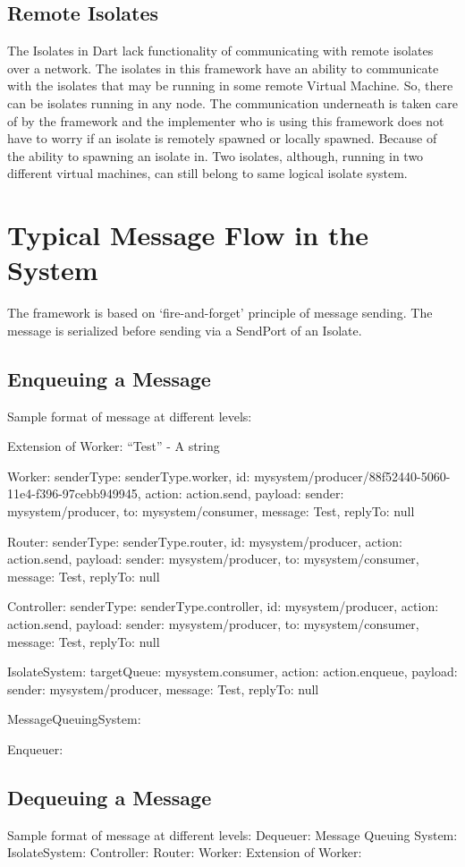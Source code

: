 \subsection{Remote Isolates}
The Isolates in Dart lack functionality of communicating with remote isolates over a network. The isolates in this framework have an ability to communicate with the isolates that may be running in some remote Virtual Machine. So, there can be isolates running in any node. The communication underneath is taken care of by the framework and the implementer who is using this framework does not have to worry if an isolate is remotely spawned or locally spawned.
Because of the ability to spawning an isolate in. Two isolates, although, running in two different virtual machines, can still belong to same logical isolate system.

\section{Typical Message Flow in the System}
The framework is based on ‘fire-and-forget’ principle of message sending.
The message is serialized before sending via a SendPort of an Isolate.

\subsection{Enqueuing a Message}
Sample format of message at different levels:

Extension of Worker: “Test” - A string

Worker:
{senderType: senderType.worker, id: mysystem/producer/88f52440-5060-11e4-f396-97cebb949945, action: action.send, payload: {sender: mysystem/producer, to: mysystem/consumer, message: Test, replyTo: null}}

Router:
{senderType: senderType.router, id: mysystem/producer, action: action.send, payload: {sender: mysystem/producer, to: mysystem/consumer, message: Test, replyTo: null}}

Controller:
{senderType: senderType.controller, id: mysystem/producer, action: action.send, payload: {sender: mysystem/producer, to: mysystem/consumer, message: Test, replyTo: null}}

IsolateSystem:
{targetQueue: mysystem.consumer, action: action.enqueue, payload: {sender: mysystem/producer, message: Test, replyTo: null}}

MessageQueuingSystem:

Enqueuer:


\subsection{Dequeuing a Message}
Sample format of message at different levels:
Dequeuer:
Message Queuing System:
IsolateSystem:
Controller:
Router:
Worker:
Extension of Worker:

